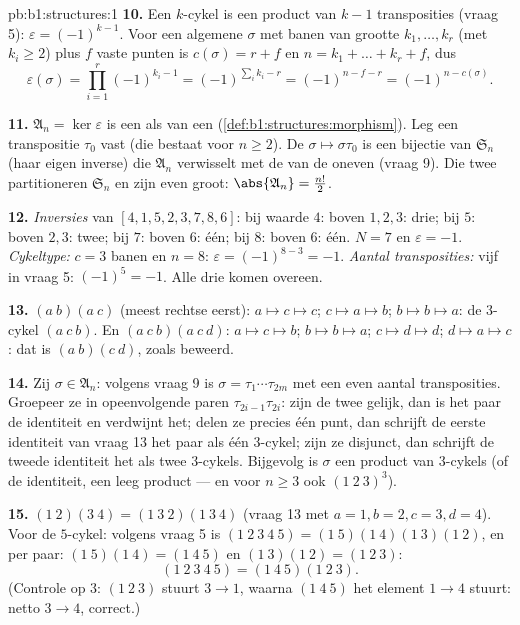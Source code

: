 \begin{solution}{pb:b1:structures:1}
\textbf{10.} Een $k$-cykel is een product van $k - 1$ transposities
(vraag 5): $\varepsilon = (-1)^{k-1}$. Voor een algemene $\sigma$ met
banen van grootte $k_1, \dots, k_r$ (met $k_i \geq 2$) plus $f$ vaste
punten is $c(\sigma) = r + f$ en $n = k_1 + \dots + k_r + f$, dus
\[
\varepsilon(\sigma) = \prod_{i=1}^r (-1)^{k_i - 1}
= (-1)^{\sum_i k_i - r} = (-1)^{n - f - r} = (-1)^{n -
c(\sigma)} .
\]

\textbf{11.} $\mathfrak A_n = \ker\varepsilon$ is een  als 
van een  (\cref{def:b1:structures:morphism}). Leg een transpositie
$\tau_0$ vast (die bestaat voor $n \geq 2$). De  $\sigma \mapsto
\sigma\tau_0$ is een bijectie van $\mathfrak S_n$ (haar eigen inverse) die
$\mathfrak A_n$ verwisselt met de  van de oneven 
(vraag 9). Die twee  partitioneren $\mathfrak S_n$ en zijn
even groot: $\abs{\mathfrak A_n} = \frac{n!}2$.

\textbf{12.} \emph{Inversies} van $[4, 1, 5, 2, 3, 7, 8, 6]$: bij waarde
$4$: boven $1, 2, 3$: drie; bij $5$: boven $2, 3$: twee; bij $7$: boven
$6$: één; bij $8$: boven $6$: één. $N = 7$ en $\varepsilon = -1$.
\emph{Cykeltype:} $c = 3$ banen en $n = 8$: $\varepsilon = (-1)^{8-3} =
-1$. \emph{Aantal transposities:} vijf in vraag 5: $(-1)^5 = -1$. Alle
drie komen overeen.

\textbf{13.} $(a\ b)(a\ c)$ (meest rechtse eerst): $a \mapsto c \mapsto
c$; $c \mapsto a \mapsto b$; $b \mapsto b \mapsto a$: de $3$-cykel $(a\ c\
b)$. En $(a\ c\ b)(a\ c\ d)$: $a \mapsto c \mapsto b$; $b \mapsto b
\mapsto a$; $c \mapsto d \mapsto d$; $d \mapsto a \mapsto c$: dat is $(a\
b)(c\ d)$, zoals beweerd.

\textbf{14.} Zij $\sigma \in \mathfrak A_n$: volgens vraag 9 is $\sigma =
\tau_1\cdots\tau_{2m}$ met een even aantal transposities. Groepeer ze in
opeenvolgende paren $\tau_{2i-1}\tau_{2i}$: zijn de twee gelijk, dan is
het paar de identiteit en verdwijnt het; delen ze precies één punt, dan
schrijft de eerste identiteit van vraag 13 het paar als één $3$-cykel;
zijn ze disjunct, dan schrijft de tweede identiteit het als twee
$3$-cykels. Bijgevolg is $\sigma$ een product van $3$-cykels (of de
identiteit, een leeg product --- en voor $n \geq 3$ ook $(1\ 2\ 3)^3$).

\textbf{15.} $(1\ 2)(3\ 4) = (1\ 3\ 2)(1\ 3\ 4)$ (vraag 13 met $a{=}1,
b{=}2, c{=}3, d{=}4$). Voor de $5$-cykel: volgens vraag 5 is $(1\ 2\ 3\ 4\
5) = (1\ 5)(1\ 4)(1\ 3)(1\ 2)$, en per paar: $(1\ 5)(1\ 4) = (1\ 4\ 5)$
en $(1\ 3)(1\ 2) = (1\ 2\ 3)$:
\[
(1\ 2\ 3\ 4\ 5) = (1\ 4\ 5)(1\ 2\ 3) .
\]
(Controle op $3$: $(1\ 2\ 3)$ stuurt $3 \to 1$, waarna $(1\ 4\ 5)$ het
element $1 \to 4$ stuurt: netto $3 \to 4$, correct.)


\end{solution}

